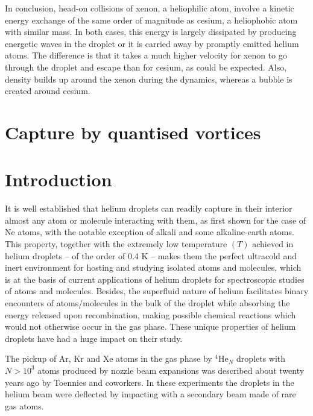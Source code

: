 In conclusion, head-on collisions of xenon, a heliophilic atom, involve a kinetic energy exchange of the same order of magnitude as cesium, a heliophobic atom with similar mass.
In both cases, this energy is largely dissipated by  producing energetic waves in the droplet or it is carried away by promptly emitted helium atoms.
The difference is that it takes a much higher velocity for xenon to go through the droplet and escape than for cesium, as could be expected.
Also, density builds up around the xenon during the dynamics, whereas a bubble is created around cesium.


	\section{Capture by quantised vortices}
		\section{Introduction}

It is well established that helium droplets can readily capture in their interior
almost any atom or molecule interacting with them, 
as first shown for the case of Ne atoms,\cite{Sch90}
with the notable exception 
of alkali\cite{Sti96} and some alkaline-earth\cite{Her07} atoms.
This property, together with the extremely low temperature $(T)$ achieved in 
helium droplets -- of the order of 0.4 K -- makes them the perfect ultracold and inert 
environment for hosting and studying isolated atoms and molecules, which 
is at the basis of current applications of helium droplets 
for spectroscopic studies 
of atoms and molecules.
Besides, the superfluid nature of helium facilitates binary encounters of atoms/molecules
in the bulk of the droplet
while absorbing the energy released upon recombination,
making possible chemical reactions which would not otherwise 
occur in the gas phase.
These unique properties  of helium droplets have had
a huge impact on their study.\cite{Toe04,Sti06,Tig07,Cal11a,Mud14} 

The pickup of Ar, Kr and Xe atoms in the gas phase by $^4$He$_N$ droplets 
with $N> 10^3$ atoms produced by nozzle beam expansions 
was described about twenty years ago by Toennies and coworkers.\cite{Lew95} 
In these experiments the droplets in the helium beam were deflected by 
impacting with a secondary beam made of rare gas atoms. 

